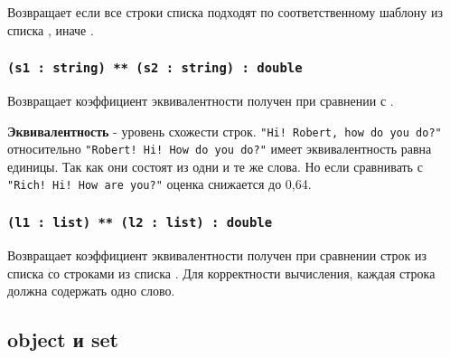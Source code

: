 Возвращает \true{} если все строки списка  подходят по соответственному шаблону из списка , иначе \false{}.

\subsubsection{\lstinline`(s1 : string) ** (s2 : string) : double`}

Возвращает коэффициент эквивалентности получен при сравнении  с .

{\bf Эквивалентность} - уровень схожести строк. \lstinline`"Hi! Robert, how do you do?"` относительно \lstinline`"Robert! Hi! How do you do?"` имеет эквивалентность равна единицы. Так как они состоят из одни и те же слова. Но если сравнивать с  \lstinline`"Rich! Hi! How are you?"` оценка снижается до 0,64.

\subsubsection{\lstinline`(l1 : list) ** (l2 : list) : double`}

Возвращает коэффициент эквивалентности получен при сравнении строк из списка  со строками из списка .
Для корректности вычисления, каждая строка должна содержать одно слово.

\subsection{{\color{lightblue}object} и {\color{lightblue}set}}

